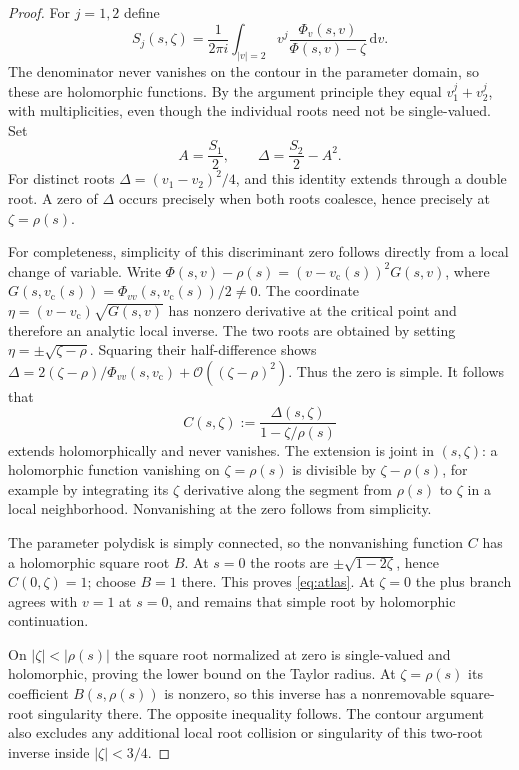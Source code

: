 \documentclass[11pt,a4paper]{article}
\theoremstyle{definition}
\theoremstyle{remark}
\newcommand{\OO}{\mathcal O}
\newcommand{\dd}{\,\mathrm d}
\newcommand{\vc}{v_{\mathrm c}}
\begin{document}
\begin{proof}
For $j=1,2$ define
\begin{equation}\label{eq:contour-moments}
 S_j(s,\zeta)=\frac1{2\pi i}\int_{|v|=2}
            v^j\frac{\Phi_v(s,v)}{\Phi(s,v)-\zeta}\dd v.
\end{equation}
The denominator never vanishes on the contour in the parameter domain,
so these are holomorphic functions. By the argument principle they equal
$v_1^j+v_2^j$, with multiplicities, even though the individual roots need
not be single-valued. Set
\[
 A=\frac{S_1}{2},\qquad
 \Delta=\frac{S_2}{2}-A^2.
\]
For distinct roots $\Delta=(v_1-v_2)^2/4$, and this identity extends
through a double root. A zero of $\Delta$ occurs precisely when both
roots coalesce, hence precisely at $\zeta=\rho(s)$.

For completeness, simplicity of this discriminant zero follows directly
from a local change of variable. Write
$\Phi(s,v)-\rho(s)=(v-\vc(s))^2G(s,v)$, where
$G(s,\vc(s))=\Phi_{vv}(s,\vc(s))/2\ne0$.
The coordinate $\eta=(v-\vc)\sqrt{G(s,v)}$ has nonzero derivative
at the critical point and therefore an analytic local inverse.
The two roots are obtained by setting $\eta=\pm\sqrt{\zeta-\rho}$.
Squaring their half-difference shows
$\Delta=2(\zeta-\rho)/\Phi_{vv}(s,\vc)+\OO((\zeta-\rho)^2)$.
Thus the zero is simple. It follows that
\[
 C(s,\zeta):=\frac{\Delta(s,\zeta)}{1-\zeta/\rho(s)}
\]
extends holomorphically and never vanishes. The extension is joint in
$(s,\zeta)$: a holomorphic function vanishing on
$\zeta=\rho(s)$ is divisible by $\zeta-\rho(s)$, for example by integrating
its $\zeta$ derivative along the segment from $\rho(s)$ to $\zeta$ in a
local neighborhood. Nonvanishing at the zero follows from simplicity.

The parameter polydisk is simply connected, so the nonvanishing function
$C$ has a holomorphic square root $B$. At $s=0$ the roots are
$\pm\sqrt{1-2\zeta}$, hence $C(0,\zeta)=1$; choose $B=1$ there.
This proves \eqref{eq:atlas}. At $\zeta=0$ the plus branch agrees with
$v=1$ at $s=0$, and remains that simple root by holomorphic continuation.

On $|\zeta|<|\rho(s)|$ the square root normalized at zero is single-valued
and holomorphic, proving the lower bound on the Taylor radius. At
$\zeta=\rho(s)$ its coefficient $B(s,\rho(s))$ is nonzero, so this inverse
has a nonremovable square-root singularity there. The opposite inequality
follows. The contour argument also excludes any additional local root
collision or singularity of this two-root inverse inside $|\zeta|<3/4$.
\end{proof}
\end{document}
